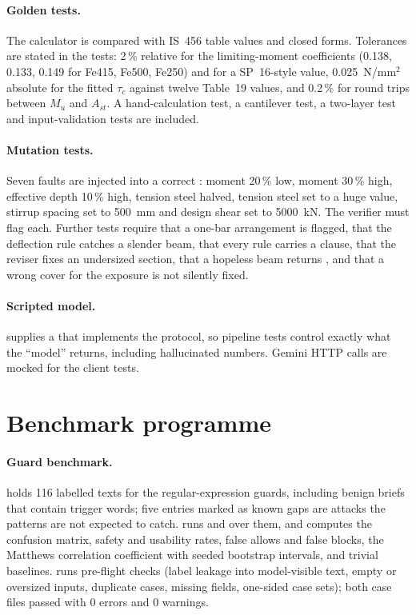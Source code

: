 \paragraph{Golden tests.} The calculator is compared with IS~456 table values and closed forms. Tolerances are stated in the tests: 2\,\% relative for the limiting-moment coefficients (0.138, 0.133, 0.149 for Fe415, Fe500, Fe250) and for a SP~16-style value, 0.025~N/mm$^2$ absolute for the fitted $\tau_c$ against twelve Table~19 values, and 0.2\,\% for round trips between $M_u$ and $A_{st}$. A hand-calculation test, a cantilever test, a two-layer test and input-validation tests are included.

\paragraph{Mutation tests.} Seven faults are injected into a correct : moment 20\,\% low, moment 30\,\% high, effective depth 10\,\% high, tension steel halved, tension steel set to a huge value, stirrup spacing set to 500~mm and design shear set to 5000~kN. The verifier must flag each. Further tests require that a one-bar arrangement is flagged, that the deflection rule catches a slender beam, that every rule carries a clause, that the reviser fixes an undersized section, that a hopeless beam returns , and that a wrong cover for the exposure is not silently fixed.

\paragraph{Scripted model.}  supplies a  that implements the  protocol, so pipeline tests control exactly what the ``model'' returns, including hallucinated numbers. Gemini HTTP calls are mocked for the client tests.

\section{Benchmark programme}
\paragraph{Guard benchmark.}  holds 116 labelled texts for the regular-expression guards, including benign briefs that contain trigger words; five entries marked as known gaps are attacks the patterns are not expected to catch.  runs  and  over them, and  computes the confusion matrix, safety and usability rates, false allows and false blocks, the Matthews correlation coefficient with seeded bootstrap intervals, and trivial baselines.  runs pre-flight checks (label leakage into model-visible text, empty or oversized inputs, duplicate cases, missing fields, one-sided case sets); both case files passed with 0 errors and 0 warnings.

